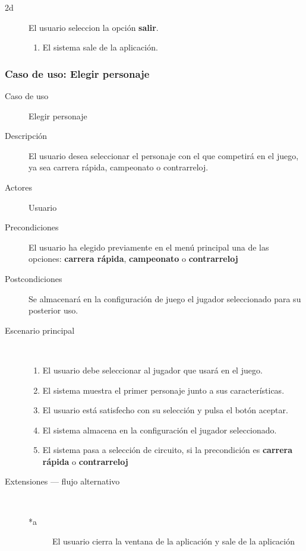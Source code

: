 \begin{description}
\begin{description}
            \item[2d ] El usuario seleccion la opción \textbf{salir}.
            \begin{enumerate}
                \item El sistema sale de la aplicación.
            \end{enumerate}
            
        \end{description}
\end{description}

\subsubsection{Caso de uso: Elegir personaje}

\begin{description}
    \item[Caso de uso] Elegir personaje
    
    \item[Descripción] El usuario desea seleccionar el personaje con el que competirá en el juego, ya sea carrera rápida, 
    campeonato o contrarreloj.
    
    \item[Actores] Usuario
    
    \item[Precondiciones] El usuario ha elegido previamente en el menú principal una de las opciones: \textbf{carrera rápida},
    \textbf{campeonato} o \textbf{contrarreloj}
    
    \item[Postcondiciones] Se almacenará en la configuración de juego el jugador seleccionado para su posterior uso.
    
    \item[Escenario principal] $\quad$
        \begin{enumerate}
            \item El usuario debe seleccionar al jugador que usará en el juego.
            \item El sistema muestra el primer personaje junto a sus características.
            \item El usuario está satisfecho con su selección y pulsa el botón aceptar.
            \item El sistema almacena en la configuración el jugador seleccionado.
            \item El sistema pasa a selección de circuito, si la precondición es \textbf{carrera rápida} o \textbf{contrarreloj}
        \end{enumerate}
    \item[Extensiones --- flujo alternativo] $\quad$
        \begin{description}
            \item[*a ] El usuario cierra la ventana de la aplicación y sale de la aplicación
            

\end{description}
\end{description}
